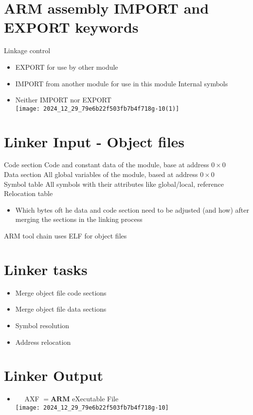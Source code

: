\section*{ARM assembly IMPORT and EXPORT keywords}
Linkage control

\begin{itemize}
  \item EXPORT for use by other module
  \item IMPORT from another module for use in this module Internal symbols
  \item Neither IMPORT nor EXPORT\\
\texttt{[image: 2024\_12\_29\_79e6b22f503fb7b4f718g-10(1)]}
\end{itemize}

\section*{Linker Input - Object files}
Code section Code and constant data of the module, base at address $0 \times 0$\\
Data section All global variables of the module, based at address $0 \times 0$\\
Symbol table All symbols with their attributes like global/local, reference\\
Relocation table

\begin{itemize}
  \item Which bytes oft he data and code section need to be adjusted (and how) after merging the sections in the linking process
\end{itemize}

ARM tool chain uses ELF for object files

\section*{Linker tasks}
\begin{itemize}
  \item Merge object file code sections
  \item Merge object file data sections
  \item Symbol resolution
  \item Address relocation
\end{itemize}

\section*{Linker Output}
\begin{itemize}
  \item $\quad$ AXF $=\mathbf{A R M}$ eXecutable File\\
\texttt{[image: 2024\_12\_29\_79e6b22f503fb7b4f718g-10]}
\end{itemize}